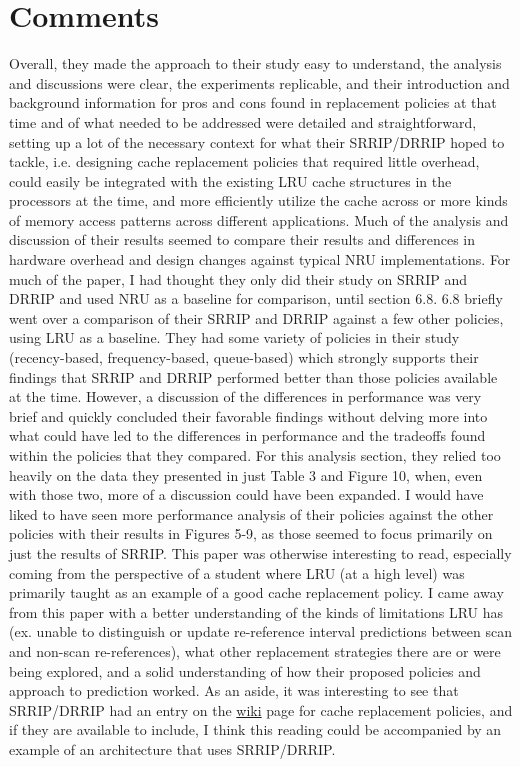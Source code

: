 \documentclass [12pt]{article}
\begin{document}
    \section{Comments} %
    \label{sec:comments}
    Overall, they made the approach to their study easy to understand, the analysis and discussions were clear, the experiments replicable, and their introduction and background information for pros and cons found in replacement policies at that time and of what needed to be addressed were detailed and straightforward, setting up a lot of the necessary context for what their SRRIP/DRRIP hoped to tackle, i.e. designing cache replacement policies that required little overhead, could easily be integrated with the existing LRU cache structures in the processors at the time, and more efficiently utilize the cache across or more kinds of memory access patterns across different applications. Much of the analysis and discussion of their results seemed to compare their results and differences in hardware overhead and design changes against typical NRU implementations. For much of the paper, I had thought they only did their study on SRRIP and DRRIP and used NRU as a baseline for comparison, until section 6.8. 6.8 briefly went over a comparison of their SRRIP and DRRIP against a few other policies, using LRU as a baseline. They had some variety of policies in their study (recency-based, frequency-based, queue-based) which strongly supports their findings that SRRIP and DRRIP performed better than those policies available at the time. However, a discussion of the differences in performance was very brief and quickly concluded their favorable findings without delving more into what could have led to the differences in performance and the tradeoffs found within the policies that they compared. For this analysis section, they relied too heavily on the data they presented in just Table 3 and Figure 10, when, even with those two, more of a discussion could have been expanded. I would have liked to have seen more performance analysis of their policies against the other policies with their results in Figures 5-9, as those seemed to focus primarily on just the results of SRRIP. This paper was otherwise interesting to read, especially coming from the perspective of a student where LRU (at a high level) was primarily taught as an example of a good cache replacement policy. I came away from this paper with a better understanding of the kinds of limitations LRU has (ex. unable to distinguish or update re-reference interval predictions between scan and non-scan re-references), what other replacement strategies there are or were being explored, and a solid understanding of how their proposed policies and approach to prediction worked. As an aside, it was interesting to see that SRRIP/DRRIP had an entry on the \href{https://en.wikipedia.org/wiki/Cache_replacement_policies}{wiki} page for cache replacement policies, and if they are available to include, I think this reading could be accompanied by an example of an architecture that uses SRRIP/DRRIP. 
\end{document}
